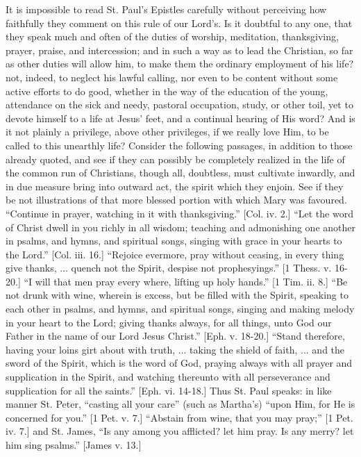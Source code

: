 It is impossible to read St. Paul's Epistles carefully without
perceiving how faithfully they comment on this rule of our Lord's.
Is it doubtful to any one, that they speak much and often of the
duties of worship, meditation, thanksgiving, prayer, praise, and
intercession; and in such a way as to lead the Christian, so far as
other duties will allow him, to make them the ordinary employment of
his life? not, indeed, to neglect his lawful calling, nor even to be
content without some active efforts to do good, whether in the way of
the education of the young, attendance on the sick and needy, pastoral
occupation, study, or other toil, yet to devote himself to a life at
Jesus' feet, and a continual hearing of His word? And is it not
plainly a privilege, above other privileges, if we really love Him, to
be called to this unearthly life? Consider the following passages, in
addition to those already quoted, and see if they can possibly be
completely realized in the life of the common run of Christians,
though all, doubtless, must cultivate inwardly, and in due measure
bring into outward act, the spirit which they enjoin. See if they be
not illustrations of that more blessed portion with which Mary was
favoured. ``Continue in prayer, watching in it with
thanksgiving.'' [Col. iv. 2.] ``Let the word of Christ dwell
in you richly in all wisdom; teaching and admonishing one another in
psalms, and hymns, and spiritual songs, singing with grace in your
hearts to the Lord.'' [Col. iii. 16.] ``Rejoice evermore, pray
without ceasing, in every thing give thanks, ... quench not the
Spirit, despise not prophesyings.'' [1 Thess. v. 16-20.] ``I
will that men pray every where, lifting up holy hands.'' [1 Tim.
ii. 8.] ``Be not drunk with wine, wherein is excess, but be filled
with the Spirit, speaking to each other in psalms, and hymns, and
spiritual songs, singing and making melody in your heart to the Lord;
giving thanks always, for all things, unto God our Father in the name
of our Lord Jesus Christ.'' [Eph. v. 18-20.] ``Stand
therefore, having your loins girt about with truth, ... taking the
shield of faith, ... and the sword of the Spirit, which is the word of
God, praying always with all prayer and supplication in the Spirit,
and watching thereunto with all perseverance and supplication for all
the saints.'' [Eph. vi. 14-18.] Thus St. Paul speaks: in like
manner St. Peter, ``casting all your care'' (such as Martha's)
``upon Him, for He is concerned for you.'' [1 Pet. v. 7.]
``Abstain from wine, that you may pray;'' [1 Pet. iv. 7.] and
St. James, ``Is any among you afflicted? let him pray. Is any
merry? let him sing psalms.'' [James v. 13.]

